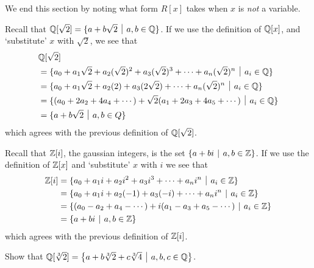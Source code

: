 We end this section by noting what form $R[x]$ takes when $x$ is \textit{not} a variable.
\begin{example}
    Recall that $\Q[\sqrt2] = \{a + b\sqrt2 \vert a,b \in \Q\}$. If we use the definition of $\mathbb{Q}[x]$, and `substitute' $x$ with $\sqrt2$, we see that
    \begin{align*}
        &\Q[\sqrt2] \\
        &= \{a_0 + a_1\sqrt2 + a_2(\sqrt2)^2 + a_3(\sqrt2)^3 + \cdots + a_n(\sqrt2)^n \vert a_i \in \Q \}\\
        &= \{a_0 + a_1\sqrt2 + a_2(2) + a_3(2\sqrt2) + \cdots + a_n(\sqrt2)^n \vert a_i \in \Q \}\\
        &= \{(a_0 + 2a_2 + 4a_4 + \cdots) + \sqrt2 (a_1 + 2a_3 + 4a_5 + \cdots) \vert a_i \in \Q\}\\
        &= \{a + b\sqrt2 \vert a,b \in Q\}
    \end{align*}
    which agrees with the previous definition of $\mathbb{Q}[\sqrt2]$.
\end{example}
\begin{example}
    Recall that $\mathbb{Z}[i]$, the gaussian integers, is the set $\{a+bi \vert a,b \in \Z\}$. If we use the definition of $\mathbb{Z}[x]$ and `substitute' $x$ with $i$ we see that
    \begin{align*}
        \Z[i] &= \{a_0 + a_1i + a_2i^2 + a_3i^3 + \cdots + a_ni^n \vert a_i \in \Z\}\\
        &= \{a_0 + a_1i + a_2(-1) + a_3(-i) + \cdots + a_ni^n \vert a_i \in \Z\}\\
        &= \{(a_0 - a_2 + a_4 - \cdots) + i(a_1 - a_3 + a_5 - \cdots) \vert a_i \in \Z\}\\
        &= \{a + bi \vert a,b \in \Z\}
    \end{align*}
    which agrees with the previous definition of $\mathbb{Z}[i]$.
\end{example}

\begin{exercise}
    Show that $\Q[\sqrt[3]{2}] = \left\{a + b\sqrt[3]{2} + c\sqrt[3]4 \vert a,b,c \in \Q\right\}$.
\end{exercise}


